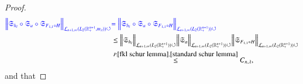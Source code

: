 \documentclass[12pt]{amsart}
\begin{document}
\begin{proof}
\begin{align*}
{\color{blue}\Big\|\mathfrak{S}_{h_l}\circ\mathfrak{S}_a\circ\mathfrak{S}_{F_{1,1}\circ H}\Big\|_{\mathcal{L}_{n+1,\infty}(L_2(\mathbb{R}^{n+1}_+,m_{\lambda}))\circlearrowleft}}
&{\color{blue}=\Big\|\mathfrak{S}_{h_l}\circ\mathfrak{S}_a\circ\mathfrak{S}_{F_{1,1}\circ H}\Big\|_{\mathcal{L}_{n+1,\infty}(L_2(\mathbb{R}^{n+1}_+))\circlearrowleft}}\\
&\leq \Big\|\mathfrak{S}_{h_l}\Big\|_{\mathcal{L}_{n+1,\infty}(L_2(\mathbb{R}^{n+1}_+))\circlearrowleft} \Big\|\mathfrak{S}_a\Big\|_{\mathcal{L}_{n+1,\infty}(L_2(\mathbb{R}^{n+1}_+))\circlearrowleft} \Big\|\mathfrak{S}_{F_{1,1}\circ H}\Big\|_{\mathcal{L}_{n+1,\infty}(L_2(\mathbb{R}^{n+1}_+))\circlearrowleft}\\
&\stackrel{P.\ref{fkl schur lemma},\ref{standard schur lemma}}{\leq}{C_{n,\lambda}},
\end{align*}
and that

\end{proof}
\end{document}
